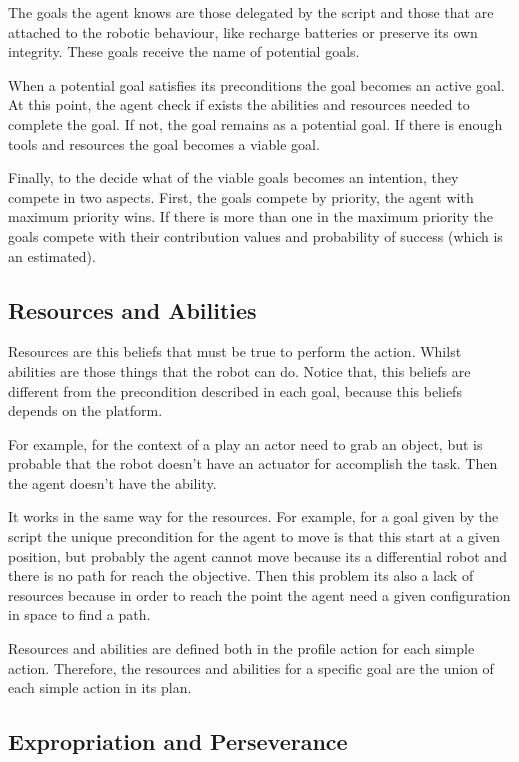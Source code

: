 The goals the agent knows are those  delegated by the script and those that are attached to the robotic behaviour, like recharge batteries or preserve its own integrity. These goals receive the name of potential goals. 

When a potential goal satisfies its preconditions the goal becomes an active goal. At this point, the agent check if exists the abilities and resources needed to complete the goal. If not, the goal remains as a potential goal. If there is enough tools and resources the goal becomes a viable goal.

Finally, to the decide what of the viable goals becomes an intention, they compete in two aspects. First, the goals compete by priority, the agent with maximum priority wins. If there is more than one in the maximum priority the goals compete with their contribution values and probability of success (which is an estimated).

\subsection{Resources and Abilities}
Resources are this beliefs that must be true to perform the action. Whilst abilities are those things that the robot can do. Notice that, this beliefs are different from the precondition described in each goal, because this beliefs depends on the platform. 

For example, for the context of a play an actor need to grab an object, but is probable that the robot doesn't have an actuator for accomplish the task. Then the agent doesn't have the ability.

It works in the same way for the resources. For example, for a goal given by the script the unique precondition for the agent to move is that this start at a given position, but probably the agent cannot move because its a differential robot and there is no path for reach the objective. Then this problem its also a lack of resources because in order to reach the point the agent need a given configuration in space to find a path.

Resources and abilities are defined both in the profile action for each simple action. Therefore, the resources and abilities for a specific goal are the union of each simple action in its plan. 

\subsection{Expropriation and Perseverance}

